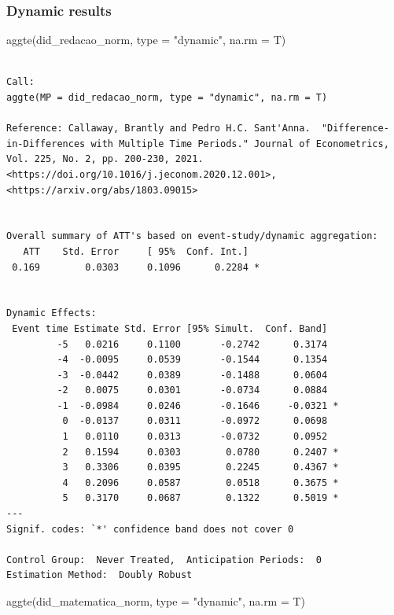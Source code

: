 \documentclass[
  letterpaper,
  DIV=11,
  numbers=noendperiod]{scrartcl}
\newenvironment{Shaded}{\begin{snugshade}}{\end{snugshade}}
\newcommand{\AttributeTok}[1]{\textcolor[rgb]{0.40,0.45,0.13}{#1}}
\newcommand{\FunctionTok}[1]{\textcolor[rgb]{0.28,0.35,0.67}{#1}}
\newcommand{\NormalTok}[1]{\textcolor[rgb]{0.00,0.23,0.31}{#1}}
\newcommand{\StringTok}[1]{\textcolor[rgb]{0.13,0.47,0.30}{#1}}
\begin{document}
\subsubsection{Dynamic results}\label{dynamic-results}

\begin{Shaded}
\begin{Highlighting}[]
\FunctionTok{aggte}\NormalTok{(did\_redacao\_norm, }\AttributeTok{type =} \StringTok{"dynamic"}\NormalTok{, }\AttributeTok{na.rm =}\NormalTok{ T)}
\end{Highlighting}
\end{Shaded}

\begin{verbatim}

Call:
aggte(MP = did_redacao_norm, type = "dynamic", na.rm = T)

Reference: Callaway, Brantly and Pedro H.C. Sant'Anna.  "Difference-in-Differences with Multiple Time Periods." Journal of Econometrics, Vol. 225, No. 2, pp. 200-230, 2021. <https://doi.org/10.1016/j.jeconom.2020.12.001>, <https://arxiv.org/abs/1803.09015> 


Overall summary of ATT's based on event-study/dynamic aggregation:  
   ATT    Std. Error     [ 95%  Conf. Int.]  
 0.169        0.0303     0.1096      0.2284 *


Dynamic Effects:
 Event time Estimate Std. Error [95% Simult.  Conf. Band]  
         -5   0.0216     0.1100       -0.2742      0.3174  
         -4  -0.0095     0.0539       -0.1544      0.1354  
         -3  -0.0442     0.0389       -0.1488      0.0604  
         -2   0.0075     0.0301       -0.0734      0.0884  
         -1  -0.0984     0.0246       -0.1646     -0.0321 *
          0  -0.0137     0.0311       -0.0972      0.0698  
          1   0.0110     0.0313       -0.0732      0.0952  
          2   0.1594     0.0303        0.0780      0.2407 *
          3   0.3306     0.0395        0.2245      0.4367 *
          4   0.2096     0.0587        0.0518      0.3675 *
          5   0.3170     0.0687        0.1322      0.5019 *
---
Signif. codes: `*' confidence band does not cover 0

Control Group:  Never Treated,  Anticipation Periods:  0
Estimation Method:  Doubly Robust
\end{verbatim}

\begin{Shaded}
\begin{Highlighting}[]
\FunctionTok{aggte}\NormalTok{(did\_matematica\_norm, }\AttributeTok{type =} \StringTok{"dynamic"}\NormalTok{, }\AttributeTok{na.rm =}\NormalTok{ T)}
\end{Highlighting}
\end{Shaded}
\end{document}
